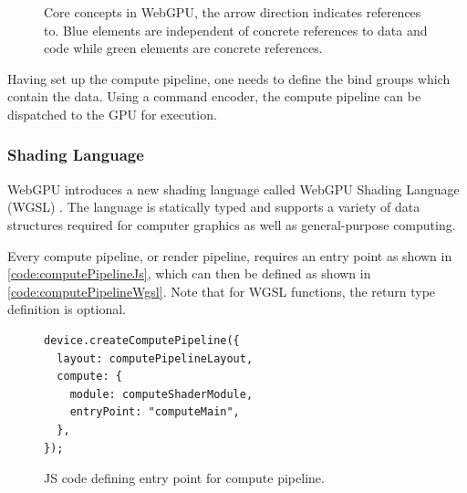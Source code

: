 \begin{figure}[H]
  \centering
  \caption{Core concepts in WebGPU, the arrow direction indicates references to. Blue elements are independent of concrete references to data and code while green elements are concrete references.}
  \label{fig:webgpu-arch}
\end{figure}

Having set up the compute pipeline, one needs to define the bind groups which contain the data. Using a command encoder, the compute pipeline can be dispatched to the \gls{GPU} for execution.

\subsubsection{Shading Language}

WebGPU introduces a new shading language called WebGPU Shading Language (\gls{WGSL}) \cite{wgslSpecification}. The language is statically typed and supports a variety of data structures required for computer graphics as well as general-purpose computing.

Every compute pipeline, or render pipeline, requires an entry point as shown in \autoref{code:computePipelineJs}, which can then be defined as shown in \autoref{code:computePipelineWgsl}. Note that for \gls{WGSL} functions, the return type definition is optional.

\begin{figure}[H]
  \begin{lstlisting}[style=JavaScript]
device.createComputePipeline({
  layout: computePipelineLayout,
  compute: {
    module: computeShaderModule,
    entryPoint: "computeMain",
  },
});
  \end{lstlisting}
  \caption{JS code defining entry point for compute pipeline.}
  \label{code:computePipelineJs}
\end{figure}

